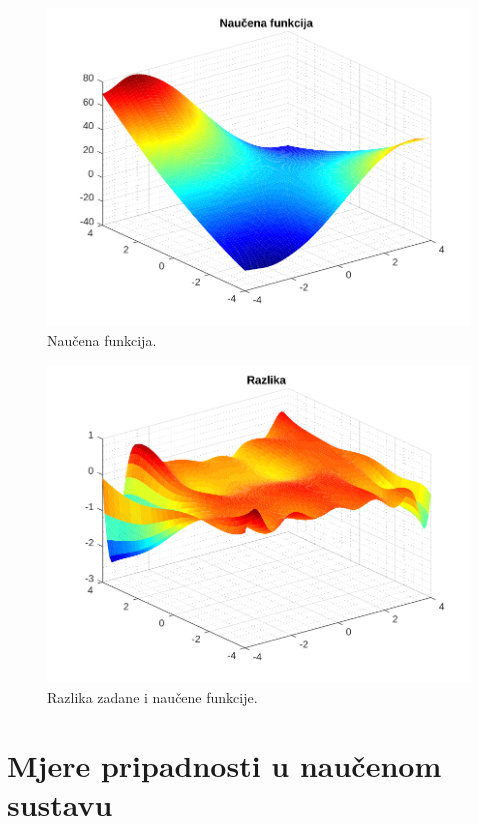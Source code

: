 \documentclass[12pt, a4paper]{article}
\begin{document}
\begin{figure}[H]
  \centering
  \includegraphics[width=\linewidth]{naucena.pdf}
  \caption{Naučena funkcija.}
\end{figure}

\begin{figure}[H]
  \centering
  \includegraphics[width=\linewidth]{razlika.pdf}
  \caption{Razlika zadane i naučene funkcije.}
\end{figure}

\section*{Mjere pripadnosti u naučenom sustavu}
\end{document}
